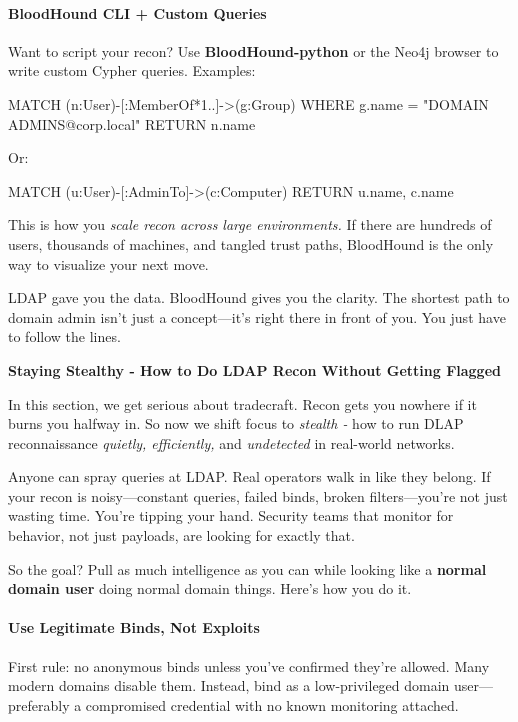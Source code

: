\paragraph{\textbf{BloodHound CLI + Custom Queries}}

Want to script your recon? Use \textbf{BloodHound-python} or the Neo4j browser to write custom Cypher queries. Examples:

MATCH (n:User)-[:MemberOf*1..]->(g:Group) WHERE g.name = "DOMAIN ADMINS@corp.local" RETURN n.name

Or:

MATCH (u:User)-[:AdminTo]->(c:Computer) RETURN u.name, c.name

This is how you \textit{scale recon across large environments.} If there are hundreds of users, thousands of machines, and tangled trust paths, BloodHound is the only way to visualize your next move.

LDAP gave you the data. BloodHound gives you the clarity. The shortest path to domain admin isn’t just a concept—it’s right there in front of you. You just have to follow the lines.

\textbf{Staying Stealthy - How to Do LDAP Recon Without Getting Flagged}

In this section, we get serious about tradecraft. Recon gets you nowhere if it burns you halfway in. So now we shift focus to \textit{stealth - }how to run DLAP reconnaissance \textit{quietly, efficiently, }and \textit{undetected }in real-world networks.

Anyone can spray queries at LDAP. Real operators walk in like they belong. If your recon is noisy—constant queries, failed binds, broken filters—you’re not just wasting time. You’re tipping your hand. Security teams that monitor for behavior, not just payloads, are looking for exactly that.

So the goal? Pull as much intelligence as you can while looking like a \textbf{normal domain user} doing normal domain things. Here’s how you do it.

\paragraph{\textbf{   Use Legitimate Binds, Not Exploits}}

First rule: no anonymous binds unless you’ve confirmed they’re allowed. Many modern domains disable them. Instead, bind as a low-privileged domain user—preferably a compromised credential with no known monitoring attached.

